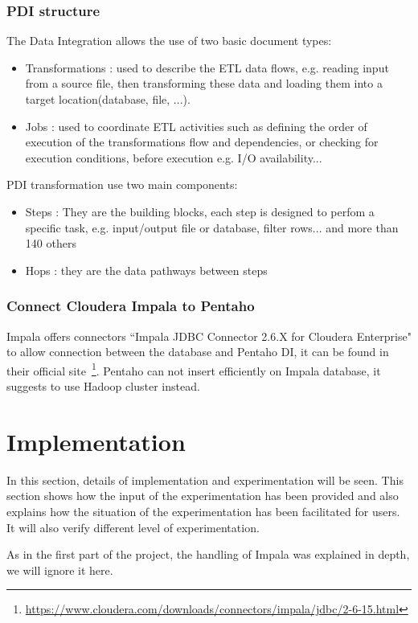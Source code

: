 \documentclass{article}
\begin{document}
\subsubsection{PDI structure}
The Data Integration allows the use of two basic document types: 
\begin{itemize}
\item Transformations : used to describe the ETL data flows, e.g. reading input from a source file, then transforming these data and loading them into a target location(database, file, ...).
\item Jobs : used to coordinate ETL activities such as defining the order of execution of the transformations flow and dependencies, or checking for execution conditions, before execution e.g. I/O availability...
\end{itemize}

PDI transformation use two main components: 
\begin{itemize}
\item Steps : They are the building blocks, each step is designed to perfom a specific task, e.g. input/output file or database, filter rows... and more than 140 others
\item Hops : they are the data pathways between steps 
\end{itemize}

\subsubsection{Connect Cloudera Impala to Pentaho}
Impala offers connectors ``Impala JDBC Connector 2.6.X for Cloudera Enterprise" to allow connection between the database and Pentaho DI, it can be found in their official site~\footnote{\url{https://www.cloudera.com/downloads/connectors/impala/jdbc/2-6-15.html}}.
Pentaho can not insert efficiently on Impala database, it suggests to use Hadoop cluster instead.

\section{Implementation}
In this section, details of implementation and experimentation will be seen. This section shows how the input of the experimentation has been provided and also explains how the situation of the experimentation has been facilitated for users. It will also verify different level of experimentation. 

As in the first part of the project, the handling of Impala was explained in depth, we will ignore it here.
\end{document}
